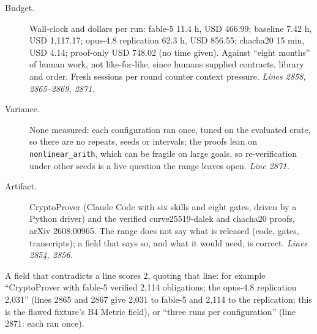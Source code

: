 \documentclass[11pt]{article}
\begin{document}
\begin{description}
\item[Budget.] Wall-clock and dollars per run: fable-5 11.4 h, USD 466.99;
  baseline 7.42 h, USD 1,117.17; opus-4.8 replication 62.3 h, USD 856.55;
  chacha20 15 min, USD 4.14; proof-only USD 748.02 (no time given). Against
  ``eight months'' of human work, not like-for-like, since humans supplied
  contracts, library and order. Fresh sessions per round counter context
  pressure. \emph{Lines 2858, 2865--2869, 2871.}
\item[Variance.] None measured: each configuration ran once, tuned on the
  evaluated crate, so there are no repeats, seeds or intervals; the proofs lean
  on \texttt{nonlinear\_arith}, which can be fragile on large goals, so
  re-verification under other seeds is a live question the range leaves open.
  \emph{Line 2871.}
\item[Artifact.] CryptoProver (Claude Code with six skills and eight gates,
  driven by a Python driver) and the verified curve25519-dalek and chacha20
  proofs, arXiv 2608.00965. The range does not say what is released (code,
  gates, transcripts); a field that says so, and what it would need, is correct.
  \emph{Lines 2854, 2856.}
\end{description}
A field that contradicts a line scores 2, quoting that line: for example
``CryptoProver with fable-5 verified 2,114 obligations; the opus-4.8
replication 2,031'' (lines 2865 and 2867 give 2,031 to fable-5 and 2,114 to the
replication; this is the flawed fixture's B4 Metric field), or ``three runs per
configuration'' (line 2871: each ran once).
\end{document}
